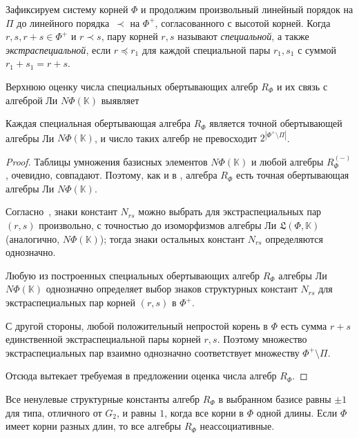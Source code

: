 \documentclass[a4paper,14pt,oneside,openany]{memoir}
\begin{document}
\medskip

Зафиксируем систему корней $\Phi$ и продолжим произвольный линейный порядок на
$\Pi$ до линейного порядка~$\prec$ на $\Phi^+$, согласованного с высотой
корней. Когда $r,s,r+s\in\Phi^+$ и $r \prec s$, пару корней $r, s$ называют
\emph{специальной}, а также \emph{экстраспециальной}, если $r \preccurlyeq r_1$
для каждой специальной пары $r_1, s_1$ с суммой $r_1+s_1 =r+s$.

Верхнюю оценку числа специальных обертывающих алгебр $R_{\Phi}$ и их связь с
алгеброй Ли $N\Phi(\mathbb{K})$ выявляет

\begin{proposition}\label{p:mult-enveloping}
    Каждая специальная обертывающая алгебра $R_{\Phi}$ является точной обертывающей
    алгебры Ли $N\Phi(\mathbb{K})$, и число таких алгебр не превосходит $2^{|\Phi^+
        \setminus \Pi|}$.
\end{proposition}

\begin{proof}
    Таблицы умножения базисных элементов $N\Phi(\mathbb{K})$ и любой алгебры
    $R_{\Phi}^{(-)}$, очевидно, совпадают. Поэтому, как и в {\cite[предложение
        1]{DAN2018}}, алгебра $R_{\Phi}$ есть точная обертывающая алгебры Ли
    $N\Phi(\mathbb{K})$.

    Согласно~\cite[предложение 4.2.2]{carter72}, знаки констант $N_{rs}$ можно
    выбрать для экстраспециальных пар $(r,s)$ произвольно, с точностью до
    изоморфизмов алгебры Ли $\mathfrak{L} (\Phi, \mathbb{K})$ (аналогично,
    $N\Phi(\mathbb{K})$); тогда знаки остальных констант $N_{rs}$ определяются
    однозначно.

    Любую из построенных специальных обертывающих алгебр $R_{\Phi}$ алгебры Ли
    $N\Phi(\mathbb{K})$ однозначно определяет выбор знаков структурных констант
    $N_{rs}$ для экстраспециальных пар корней $(r,s)$ в $\Phi^+$.

    С другой стороны, любой положительный непростой корень в $\Phi$ есть сумма
    $r+s$ единственной экстраспециальной пары корней $r,s$. Поэтому множество
    экстраспециальных пар взаимно однозначно соответствует множеству $\Phi^+
    \setminus \Pi$.

    Отсюда вытекает требуемая в предложении оценка числа алгебр $R_{\Phi}$.
\end{proof}

\begin{lemma}\label{l:Const-RPhi-Non-assoc}
    Все ненулевые структурные константы алгебр $R_{\Phi}$ в выбранном базисе равны
    $\pm 1$ для типа, отличного от $G_2$, и равны $1$, когда все корни в $\Phi$
    одной длины. Если $\Phi$ имеет корни разных длин, то все алгебры $R_{\Phi}$
    неассоциативные.
\end{lemma}
\end{document}
